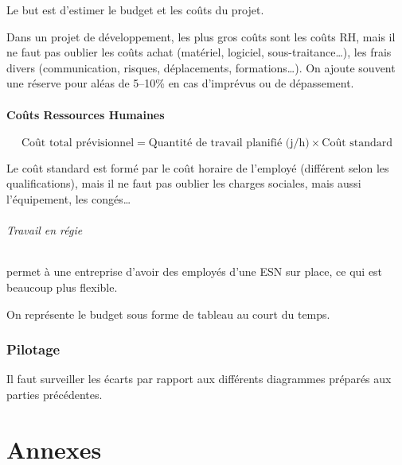 \documentclass[10pt,a4paper,french]{article}
\begin{document}
Le but est d'estimer le budget et les coûts du projet.

Dans un projet de développement, les plus gros coûts sont les coûts RH, mais il ne faut pas oublier les coûts achat (matériel, logiciel, sous-traitance\ldots), les frais divers (communication, risques, déplacements, formations\ldots). On ajoute souvent une réserve pour aléas de 5--10\% en cas d'imprévus ou de dépassement.

\subsection{Coûts Ressources Humaines}
\[ \text{Coût total prévisionnel} = \text{Quantité de travail planifié (j/h)} \times \text{Coût standard} \]

Le coût standard est formé par le coût horaire de l'employé (différent selon les qualifications), mais il ne faut pas oublier les charges sociales, mais aussi l'équipement, les congés\ldots

\paragraph{Travail en régie}
permet à une entreprise d'avoir des employés d'une ESN sur place, ce qui est beaucoup plus flexible.

On représente le budget sous forme de tableau au court du temps.

\section{Pilotage}
Il faut surveiller les écarts par rapport aux différents diagrammes préparés aux parties précédentes.

\appendix %
\part{Annexes}
\printglossaries
\printindex
\end{document}
